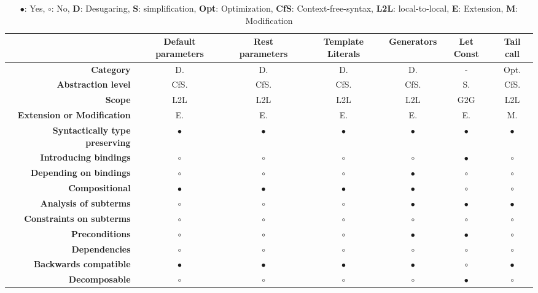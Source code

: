 \begin{landscape}
\begin{table}[h]
\begin{tabular}{rcccccc}
\hline
& {\bf Default parameters} & {\bf Rest parameters} & {\bf Template Literals} & {\bf Generators} & {\bf Let Const} & {\bf Tail call} \\ \hline
{\bf Category} & D. & D. & D. & D. & - & Opt. \\
{\bf Abstraction level} & CfS. & CfS. & CfS. & CfS. & S. & CfS. \\
{\bf Scope} & L2L & L2L & L2L & L2L & G2G & L2L \\
{\bf Extension or Modification} & E. & E. & E. & E. & E. & M. \\
{\bf Syntactically type preserving} & $\bullet$ & $\bullet$ & $\bullet$ & $\bullet$ & $\bullet$  & $\bullet$      \\
{\bf Introducing bindings} & $\circ$ & $\circ$ & $\circ$ & $\circ$ & $\bullet$ & $\circ$ \\
{\bf Depending on bindings} & $\circ$ & $\circ$ & $\circ$ & $\bullet$ & $\circ$ & $\circ$ \\
{\bf Compositional} & $\bullet$ & $\bullet$ & $\bullet$ & $\bullet$ & $\circ$ & $\circ$ \\
{\bf Analysis of subterms} & $\circ$ & $\circ$ & $\circ$ & $\bullet$ & $\bullet$ & $\bullet$ \\
{\bf Constraints on subterms} & $\circ$ & $\circ$ & $\circ$ & $\circ$ & $\circ$ & $\circ$ \\
{\bf Preconditions} & $\circ$ & $\circ$ & $\circ$ & $\bullet$ & $\bullet$ & $\circ$ \\
{\bf Dependencies} & $\circ$ & $\circ$ & $\circ$ & $\circ$ & $\circ$ & $\circ$ \\
{\bf Backwards compatible} & $\bullet$ & $\bullet$ & $\bullet$ & $\bullet$ & $\circ$ & $\bullet$ \\
{\bf Decomposable} & $\circ$ & $\circ$ & $\circ$ & $\circ$ & $\bullet$ & $\circ$ \\ \hline
\end{tabular}
\caption*{$\bullet$: Yes, $\circ$: No, \textbf{D}: Desugaring, \textbf{S}: simplification, \textbf{Opt}: Optimization, \textbf{CfS}: Context-free-syntax, \textbf{L2L}: local-to-local, \textbf{E}: Extension, \textbf{M}: Modification}
\end{table}
\end{landscape}